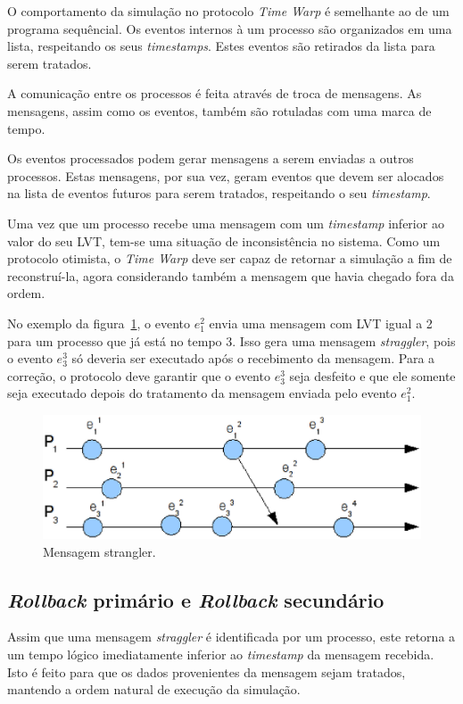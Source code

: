 O comportamento da simulação no protocolo \textit{Time Warp} é semelhante ao de um programa sequêncial. Os eventos internos à um processo são organizados em uma lista, respeitando os seus \textit{timestamps}. Estes eventos são retirados da lista para serem tratados. 

A comunicação entre os processos é feita através de troca de mensagens. As mensagens, assim como os eventos, também são rotuladas com uma marca de tempo. 

Os eventos processados podem gerar mensagens a serem enviadas a outros processos. Estas mensagens, por sua vez, geram eventos que devem ser alocados na lista de eventos futuros para serem tratados, respeitando o seu \textit{timestamp}.

Uma vez que um processo recebe uma mensagem com um \textit{timestamp} inferior ao valor do seu LVT, tem-se uma situação de inconsistência no sistema. Como um protocolo otimista, o \textit{Time Warp} deve ser capaz de retornar a simulação a fim de reconstruí-la, agora considerando também a mensagem que havia chegado fora da ordem.
	
No exemplo da figura~\ref{fig:strangler}, o evento $e_{1}^{2}$ envia uma mensagem com LVT igual a 2 para um processo que já está no tempo 3. Isso gera uma mensagem \textit{straggler}, pois o evento $e_{3}^{3}$ só deveria ser executado após o recebimento da mensagem. Para a correção, o protocolo deve garantir que o evento $e_{3}^{3}$ seja desfeito e que ele somente seja executado depois do tratamento da mensagem enviada pelo evento $e_{1}^{2}$.

\begin{figure}
  \centerline{\includegraphics[scale=0.6]{strangler.eps}}
  \caption{Mensagem strangler.}
\label{fig:strangler}
\end{figure}

\subsection{\textit{Rollback} primário e \textit{Rollback} secundário}
Assim que uma mensagem \textit{straggler} é identificada por um processo, este retorna a um tempo lógico imediatamente inferior ao \textit{timestamp} da mensagem recebida. Isto é feito para que os dados provenientes da mensagem sejam tratados, mantendo a ordem natural de execução da simulação.

